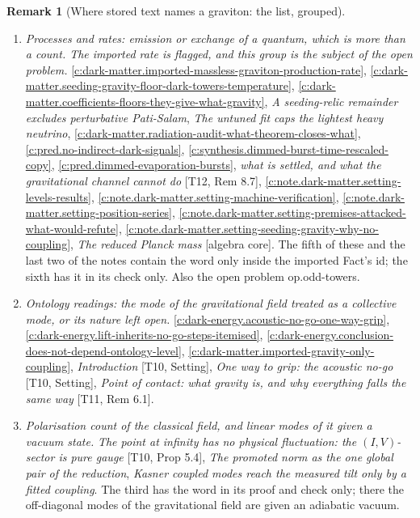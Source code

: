 \documentclass[11pt]{article}
\theoremstyle{definition}
\newtheorem{remark}[theorem]{Remark}
\theoremstyle{plain}
\begin{document}
\begin{remark}[Where stored text names a graviton: the list, grouped]
\begin{enumerate}
\item[(d)] \emph{Processes and rates: emission or exchange of a quantum, which is more than a count. The imported rate is flagged, and this group is the subject of the open problem.} \ref{c:dark-matter.imported-massless-graviton-production-rate}, \ref{c:dark-matter.seeding-gravity-floor-dark-towers-temperature}, \ref{c:dark-matter.coefficients-floors-they-give-what-gravity}, \emph{A seeding-relic remainder excludes perturbative Pati-Salam}, \emph{The untuned fit caps the lightest heavy neutrino}, \ref{c:dark-matter.radiation-audit-what-theorem-closes-what}, \ref{c:pred.no-indirect-dark-signals}, \ref{c:synthesis.dimmed-burst-time-rescaled-copy}, \ref{c:pred.dimmed-evaporation-bursts}, \emph{what is settled, and what the gravitational channel cannot do} [T12, Rem 8.7], \ref{c:note.dark-matter.setting-levels-results}, \ref{c:note.dark-matter.setting-machine-verification}, \ref{c:note.dark-matter.setting-position-series}, \ref{c:note.dark-matter.setting-premises-attacked-what-would-refute}, \ref{c:note.dark-matter.setting-seeding-gravity-why-no-coupling}, \emph{The reduced Planck mass} [algebra core]. The fifth of these and the last two of the notes contain the word only inside the imported Fact's id; the sixth has it in its check only. Also the open problem op.odd-towers.
\item[(e)] \emph{Ontology readings: the mode of the gravitational field treated as a collective mode, or its nature left open.} \ref{c:dark-energy.acoustic-no-go-one-way-grip}, \ref{c:dark-energy.lift-inherits-no-go-steps-itemised}, \ref{c:dark-energy.conclusion-does-not-depend-ontology-level}, \ref{c:dark-matter.imported-gravity-only-coupling}, \emph{Introduction} [T10, Setting], \emph{One way to grip: the acoustic no-go} [T10, Setting], \emph{Point of contact: what gravity is, and why everything falls the same way} [T11, Rem 6.1].
\item[(f)] \emph{Polarisation count of the classical field, and linear modes of it given a vacuum state.} \emph{The point at infinity has no physical fluctuation: the $(I,V)$-sector is pure gauge} [T10, Prop 5.4], \emph{The promoted norm as the one global pair of the reduction}, \emph{Kasner coupled modes reach the measured tilt only by a fitted coupling}. The third has the word in its proof and check only; there the off-diagonal modes of the gravitational field are given an adiabatic vacuum.

\end{enumerate}
\end{remark}
\end{document}
